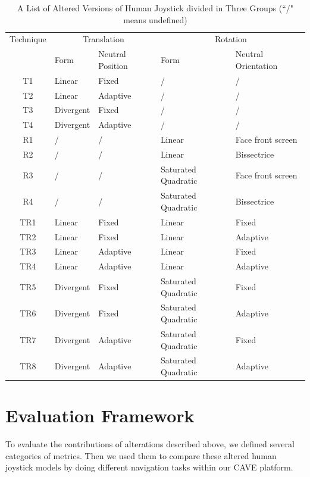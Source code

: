 \begin{table}[hbt]
\renewcommand{\arraystretch}{1.3}
\caption{A List of Altered Versions of Human Joystick divided in Three Groups (``/" means undefined)}
\label{tab:4_combinations}
\centering
\begin{tabular}{c l l l l}
  \hline
  Technique & \multicolumn{2}{c}{Translation} & \multicolumn{2}{c}{Rotation} \\
   & Form & Neutral Position & Form & Neutral Orientation \\ \hline
  T1 & Linear & Fixed & / & / \\
  T2 & Linear & Adaptive & / & / \\
  T3 & Divergent & Fixed & / & / \\
  T4 & Divergent & Adaptive & / & / \\ \hline
  R1 & / & / & Linear & Face front screen \\
  R2 & / & / & Linear & Bissectrice \\
  R3 & / & / & Saturated Quadratic & Face front screen \\
  R4 & / & / & Saturated Quadratic & Bissectrice \\ \hline
  TR1 & Linear & Fixed & Linear & Fixed \\ TR2 & Linear & Fixed & Linear & Adaptive \\
  TR3 & Linear & Adaptive & Linear & Fixed \\ TR4 & Linear & Adaptive & Linear & Adaptive \\
  TR5 & Divergent & Fixed & Saturated Quadratic & Fixed \\ TR6 & Divergent & Fixed & Saturated Quadratic & Adaptive \\
  TR7 & Divergent & Adaptive & Saturated Quadratic & Fixed \\ TR8 & Divergent & Adaptive & Saturated Quadratic & Adaptive \\
  \hline
\end{tabular}
\end{table}




\section{Evaluation Framework}
\label{sec:eval_framework}
To evaluate the contributions of alterations described above, we defined several categories of metrics. Then we used them to compare these altered human joystick models by doing different navigation tasks within our CAVE platform.

